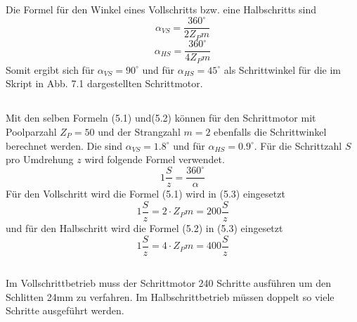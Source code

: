 \chapter{}\label{ex:aufg5}

\section{}\label{sec:aufg5a}
Die Formel für den Winkel eines Vollschritts bzw. eine Halbschritts sind
\begin{equation}
	\alpha_{VS} = \frac{360^\circ}{2Z_P m}
\end{equation}
\begin{equation}
\alpha_{HS} = \frac{360^\circ}{4Z_P m}
\end{equation}
Somit ergibt sich für $\alpha_{VS} = 90^\circ$ und für $\alpha_{HS} = 45^\circ$ als Schrittwinkel für die im Skript in Abb. 7.1 dargestellten Schrittmotor.

\section{}\label{sec:aufg5b}
Mit den selben Formeln (5.1) und(5.2) können für den Schrittmotor mit Poolparzahl $Z_P = 50$ und der Strangzahl $m = 2$ ebenfalls die Schrittwinkel berechnet werden. Die sind $\alpha_{VS} =1.8^\circ$ und für $\alpha_{HS} = 0.9^\circ$.
Für die Schrittzahl $S$ pro Umdrehung $z$ wird folgende Formel verwendet.
\begin{equation}		
	1\frac{S}{z} = \frac{360^\circ}{\alpha}
\end{equation}
Für den Vollschritt wird die Formel (5.1) wird in (5.3) eingesetzt
\begin{equation}
	1\frac{S}{z} = 2\cdot Z_P m = 200 \frac{S}{z}
\end{equation}
und für den Halbschritt wird die Formel (5.2) in (5.3) eingesetzt
\begin{equation}
	1\frac{S}{z} = 4\cdot Z_P m = 400 \frac{S}{z}
\end{equation}

%
\section{}\label{sec:aufg5c}
Im Vollschrittbetrieb muss der Schrittmotor 240 Schritte ausführen um den Schlitten 24mm zu verfahren. Im Halbschrittbetrieb müssen doppelt so viele Schritte ausgeführt werden.
\clearpage